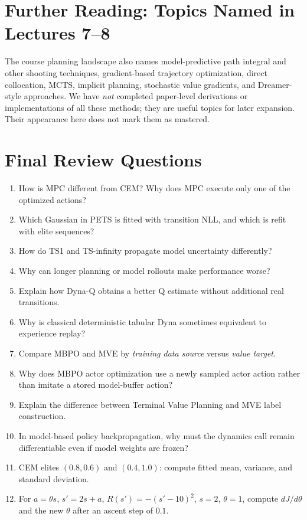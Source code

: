 \section{Further Reading: Topics Named in Lectures 7--8}
The course planning landscape also names model-predictive path integral and other shooting techniques, gradient-based trajectory optimization, direct collocation, MCTS, implicit planning, stochastic value gradients, and Dreamer-style approaches. We have \emph{not} completed paper-level derivations or implementations of all these methods; they are useful topics for later expansion. Their appearance here does not mark them as mastered.

\section{Final Review Questions}
\begin{enumerate}
\item How is MPC different from CEM? Why does MPC execute only one of the optimized actions?
\item Which Gaussian in PETS is fitted with transition NLL, and which is refit with elite sequences?
\item How do TS1 and TS-infinity propagate model uncertainty differently?
\item Why can longer planning or model rollouts make performance worse?
\item Explain how Dyna-Q obtains a better Q estimate without additional real transitions.
\item Why is classical deterministic tabular Dyna sometimes equivalent to experience replay?
\item Compare MBPO and MVE by \emph{training data source} versus \emph{value target}.
\item Why does MBPO actor optimization use a newly sampled actor action rather than imitate a stored model-buffer action?
\item Explain the difference between Terminal Value Planning and MVE label construction.
\item In model-based policy backpropagation, why must the dynamics call remain differentiable even if model weights are frozen?
\item CEM elites $(0.8,0.6)$ and $(0.4,1.0)$: compute fitted mean, variance, and standard deviation.
\item For $a=\theta s$, $s'=2s+a$, $R(s')=-(s'-10)^2$, $s=2$, $\theta=1$, compute $dJ/d\theta$ and the new $\theta$ after an ascent step of $0.1$.
\end{enumerate}
